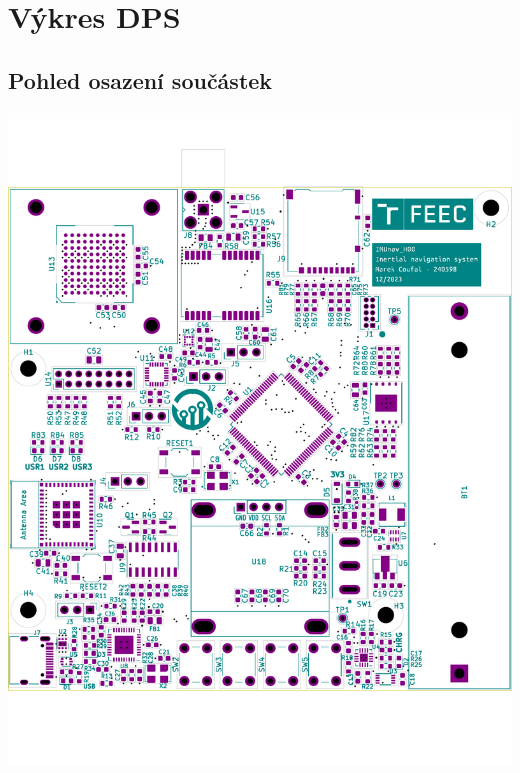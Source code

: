 \chapter{Výkres DPS}
\section{Pohled osazení součástek} \label{placementApp}
\includegraphics[width=\textwidth]{KiCad/boardTopParts}

